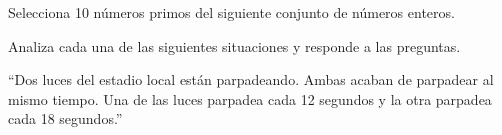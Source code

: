 \documentclass[11pt,addpoints]{exam}
\begin{document}

\begin{questions}

    \question[10] Selecciona 10 n\'umeros primos del siguiente conjunto de n\'umeros enteros.
    \begin{multicols}{6}
        \begin{checkboxes}
        \end{checkboxes}
    \end{multicols}

    \question Analiza cada una de las siguientes situaciones y responde a las preguntas.
   
        ``Dos luces del estadio local están parpadeando. Ambas acaban de parpadear al mismo tiempo.
        Una de las luces parpadea cada 12 segundos y la otra parpadea cada 18 segundos.''
        \begin{parts}

\end{parts}
\end{questions}
\end{document}
